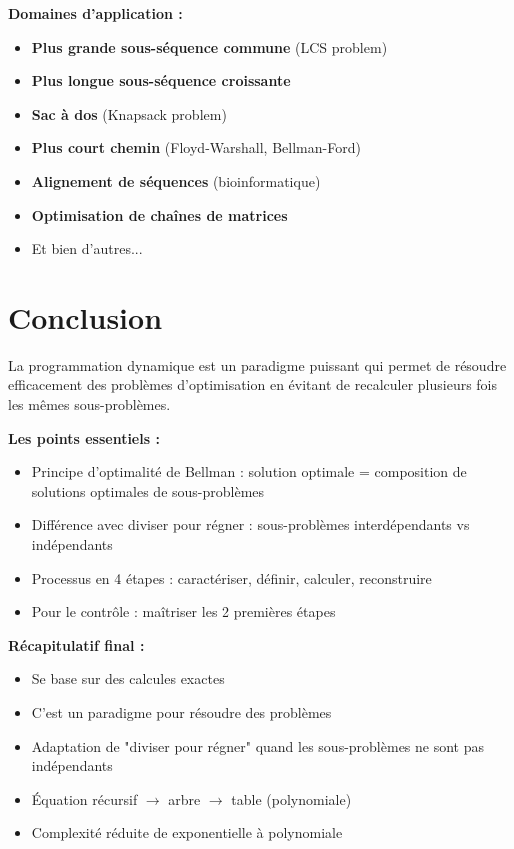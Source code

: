 \documentclass[12pt,a4paper]{article}
\begin{document}
\begin{exemple}
\textbf{Domaines d'application :}

\begin{itemize}
    \item \textbf{Plus grande sous-séquence commune} (LCS problem)
    \item \textbf{Plus longue sous-séquence croissante}
    \item \textbf{Sac à dos} (Knapsack problem)
    \item \textbf{Plus court chemin} (Floyd-Warshall, Bellman-Ford)
    \item \textbf{Alignement de séquences} (bioinformatique)
    \item \textbf{Optimisation de chaînes de matrices}
    \item Et bien d'autres...
\end{itemize}
\end{exemple}

\newpage
\section{Conclusion}

\begin{important}
La programmation dynamique est un paradigme puissant qui permet de résoudre efficacement des problèmes d'optimisation en évitant de recalculer plusieurs fois les mêmes sous-problèmes.

\textbf{Les points essentiels :}
\begin{itemize}
    \item \textcolor{titrebleu}{Principe d'optimalité de Bellman} : solution optimale = composition de solutions optimales de sous-problèmes
    
    \item \textcolor{titrebleu}{Différence avec diviser pour régner} : sous-problèmes interdépendants vs indépendants
    
    \item \textcolor{titrebleu}{Processus en 4 étapes} : caractériser, définir, calculer, reconstruire
    
    \item \textcolor{titrebleu}{Pour le contrôle} : maîtriser les 2 premières étapes
\end{itemize}
\end{important}

\begin{notecours}
\textbf{Récapitulatif final :}
\begin{itemize}
    \item Se base sur des calcules exactes
    \item C'est un paradigme pour résoudre des problèmes
    \item Adaptation de "diviser pour régner" quand les sous-problèmes ne sont pas indépendants
    \item Équation récursif $\rightarrow$ arbre $\rightarrow$ table (polynomiale)
    \item Complexité réduite de exponentielle à polynomiale
\end{itemize}
\end{notecours}
\end{document}
